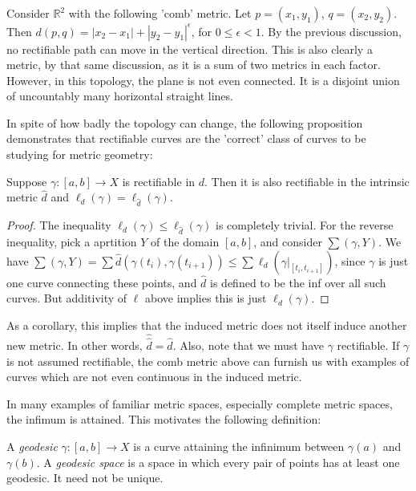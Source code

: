 \documentclass[12pt]{amsart}
\begin{document}
\begin{example}
Consider $\mathbb{R}^2$ with the following 'comb' metric. Let $p = (x_1, y_1)$, $q = (x_2, y_2)$. Then $d(p,q)= |x_2 - x_1| + |y_2 - y_1|^\epsilon$, for $0 \leq \epsilon < 1$. By the previous discussion, no rectifiable path can move in the vertical direction. This is also clearly a metric, by that same discussion, as it is a sum of two metrics in each factor. However, in this topology, the plane is not even connected. It is a disjoint union of uncountably many horizontal straight lines. 
\end{example}

In spite of how badly the topology can change, the following proposition demonstrates that rectifiable curves are the 'correct' class of curves to be studying for metric geometry:

\begin{proposition}
Suppose $\gamma:[a,b] \to X$ is rectifiable in $d$. Then it is also rectifiable in the intrinsic metric $\hat{d}$ and $\ell_d (\gamma) = \ell_{\hat{d}} (\gamma)$.
\end{proposition}

\begin{proof}
The inequality $\ell_d (\gamma) \leq \ell_{\hat{d}} (\gamma)$ is completely trivial. For the reverse inequality, pick a aprtition $Y$ of the domain $[a,b]$, and consider $\sum(\gamma, Y)$. We have $\sum(\gamma, Y) = \sum \hat{d}(\gamma(t_i), \gamma(t_{i+1})) \leq \sum \ell_d(\gamma|_{[t_i, t_{i+1}]})$, since $\gamma$ is just one curve connecting these points, and $\hat{d}$ is defined to be the inf over all such curves. But additivity of $\ell$ above implies this is just $\ell_d (\gamma)$.
\end{proof}

As a corollary, this implies that the induced metric does not itself induce another new metric. In other words, $\hat{\hat{d}} = \hat{d}$. Also, note that we must have $\gamma$ rectifiable. If $\gamma$ is not assumed rectifiable, the comb metric above can furnish us with examples of curves which are not even continuous in the induced metric.

In many examples of familiar metric spaces, especially complete metric spaces, the infimum is attained. This motivates the following definition:

\begin{definition}
A \textit{geodesic} $\gamma:[a,b] \to X$ is a curve attaining the infinimum between $\gamma(a)$ and $\gamma(b)$. A \textit{geodesic space} is a space in which every pair of points has at least one geodesic. It need not be unique. 
\end{definition}
\end{document}
